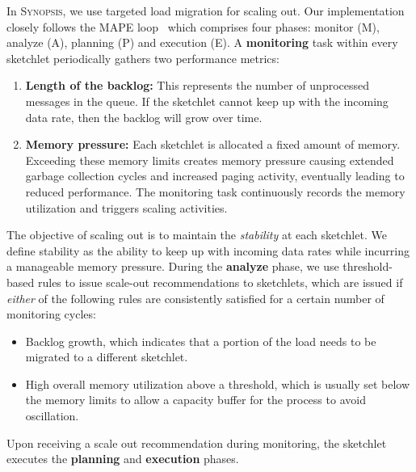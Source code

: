 In \textsc{Synopsis}, we use targeted load migration for scaling out.
Our implementation closely follows the MAPE loop~\cite{maurer2011revealing} which comprises four phases: monitor (M), analyze (A), planning (P) and execution (E).
A \textbf{monitoring} task within every sketchlet periodically gathers two performance metrics:
\begin{enumerate}[leftmargin=*]
	\item \textbf{Length of the backlog:} This represents the number of unprocessed messages in the queue. If the sketchlet cannot keep up with the incoming data rate, then the backlog will grow over time.
	\item \textbf{Memory pressure:} Each sketchlet is allocated a fixed amount of memory. 
	Exceeding these memory limits creates memory pressure causing extended garbage collection cycles and increased paging activity, eventually leading to reduced performance.
	The monitoring task continuously records the memory utilization and triggers scaling activities.
\end{enumerate} 

The objective of scaling out is to maintain the \emph{stability} at each sketchlet.
We define stability as the ability to keep up with incoming data rates while incurring a manageable memory pressure.  During the \textbf{analyze} phase, we use threshold-based rules \cite{lorido2012auto} to issue scale-out recommendations to sketchlets, which are issued if \textit{either} of the following rules are consistently satisfied for a certain number of monitoring cycles:
\begin{itemize}[leftmargin=*]  
\item Backlog growth, which indicates that a portion of the load needs to be migrated to a different sketchlet.
\item High overall memory utilization above a threshold, which is usually set below the memory limits to allow a capacity buffer for the process to avoid oscillation.
\end{itemize}
Upon receiving a scale out recommendation during monitoring, the sketchlet executes the \textbf{planning} and \textbf{execution} phases.

